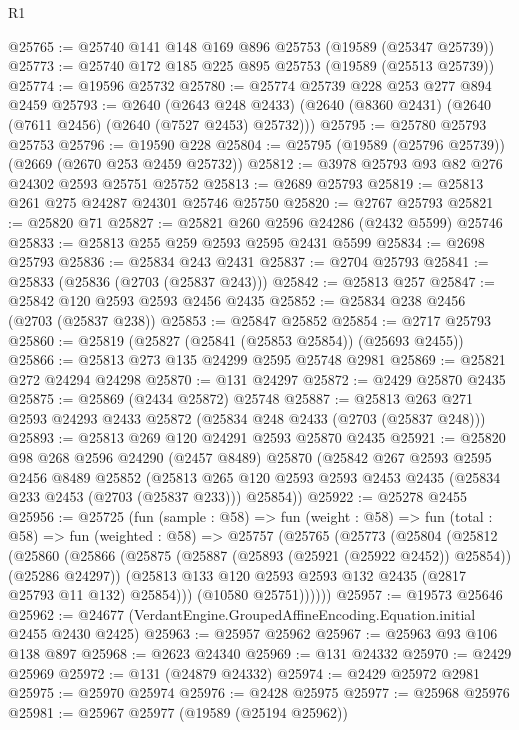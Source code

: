 \begin{lexlean}{R1}
\begin{coremodule}
@25765 := @25740 @141 @148 @169 @896 @25753 (@19589 (@25347 @25739))
@25773 := @25740 @172 @185 @225 @895 @25753 (@19589 (@25513 @25739))
@25774 := @19596 @25732
@25780 := @25774 @25739 @228 @253 @277 @894 @2459
@25793 := @2640
    (@2643 @248 @2433)
    (@2640 (@8360 @2431) (@2640 (@7611 @2456) (@2640 (@7527 @2453) @25732)))
@25795 := @25780 @25793 @25753
@25796 := @19590 @228
@25804 := @25795 (@19589 (@25796 @25739)) (@2669 (@2670 @253 @2459 @25732))
@25812 := @3978 @25793 @93 @82 @276 @24302 @2593 @25751 @25752
@25813 := @2689 @25793
@25819 := @25813 @261 @275 @24287 @24301 @25746 @25750
@25820 := @2767 @25793
@25821 := @25820 @71
@25827 := @25821 @260 @2596 @24286 (@2432 @5599) @25746
@25833 := @25813 @255 @259 @2593 @2595 @2431 @5599
@25834 := @2698 @25793
@25836 := @25834 @243 @2431
@25837 := @2704 @25793
@25841 := @25833 (@25836 (@2703 (@25837 @243)))
@25842 := @25813 @257
@25847 := @25842 @120 @2593 @2593 @2456 @2435
@25852 := @25834 @238 @2456 (@2703 (@25837 @238))
@25853 := @25847 @25852
@25854 := @2717 @25793
@25860 := @25819 (@25827 (@25841 (@25853 @25854)) (@25693 @2455))
@25866 := @25813 @273 @135 @24299 @2595 @25748 @2981
@25869 := @25821 @272 @24294 @24298
@25870 := @131 @24297
@25872 := @2429 @25870 @2435
@25875 := @25869 (@2434 @25872) @25748
@25887 := @25813 @263 @271 @2593 @24293 @2433 @25872 (@25834 @248 @2433 (@2703 (@25837 @248)))
@25893 := @25813 @269 @120 @24291 @2593 @25870 @2435
@25921 := @25820
    @98
    @268
    @2596
    @24290
    (@2457 @8489)
    @25870
    (@25842
      @267
      @2593
      @2595
      @2456
      @8489
      @25852
      (@25813 @265 @120 @2593 @2593 @2453 @2435 (@25834 @233 @2453 (@2703 (@25837 @233))) @25854))
@25922 := @25278 @2455
@25956 := @25725
    (fun (sample : @58) =>
    fun (weight : @58) =>
    fun (total : @58) =>
    fun (weighted : @58) =>
    @25757
      (@25765
        (@25773
          (@25804
            (@25812
              (@25860
                (@25866
                  (@25875 (@25887 (@25893 (@25921 (@25922 @2452)) @25854)) (@25286 @24297))
                  (@25813 @133 @120 @2593 @2593 @132 @2435 (@2817 @25793 @11 @132) @25854)))
              (@10580 @25751))))))
@25957 := @19573 @25646
@25962 := @24677 (VerdantEngine.GroupedAffineEncoding.Equation.initial @2455 @2430 @2425)
@25963 := @25957 @25962
@25967 := @25963 @93 @106 @138 @897
@25968 := @2623 @24340
@25969 := @131 @24332
@25970 := @2429 @25969
@25972 := @131 (@24879 @24332)
@25974 := @2429 @25972 @2981
@25975 := @25970 @25974
@25976 := @2428 @25975
@25977 := @25968 @25976
@25981 := @25967 @25977 (@19589 (@25194 @25962))

\end{coremodule}
\end{lexlean}

